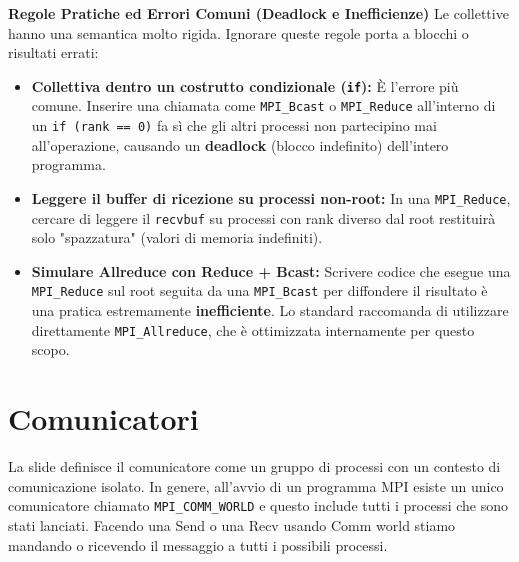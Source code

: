 \begin{framed}
\noindent
\textbf{Regole Pratiche ed Errori Comuni (Deadlock e Inefficienze)}
Le collettive hanno una semantica molto rigida. Ignorare queste regole porta a blocchi o risultati errati:

\begin{itemize}
    \item \textbf{Collettiva dentro un costrutto condizionale (\texttt{if}):} È l'errore più comune. Inserire una chiamata come \texttt{MPI\_Bcast} o \texttt{MPI\_Reduce} all'interno di un \texttt{if (rank == 0)} fa sì che gli altri processi non partecipino mai all'operazione, causando un \textbf{deadlock} (blocco indefinito) dell'intero programma.
    \item \textbf{Leggere il buffer di ricezione su processi non-root:} In una \texttt{MPI\_Reduce}, cercare di leggere il \texttt{recvbuf} su processi con rank diverso dal root restituirà solo "spazzatura" (valori di memoria indefiniti).
    \item \textbf{Simulare Allreduce con Reduce + Bcast:} Scrivere codice che esegue una \texttt{MPI\_Reduce} sul root seguita da una \texttt{MPI\_Bcast} per diffondere il risultato è una pratica estremamente \textbf{inefficiente}. Lo standard raccomanda di utilizzare direttamente \texttt{MPI\_Allreduce}, che è ottimizzata internamente per questo scopo.
\end{itemize}
\end{framed}

\section{Comunicatori}
La slide definisce il comunicatore come un gruppo di processi con un contesto di comunicazione isolato. In genere, all'avvio di un programma MPI esiste un unico comunicatore chiamato \texttt{MPI\_COMM\_WORLD} e questo include tutti i processi che sono stati lanciati. Facendo una Send o una Recv usando Comm world stiamo mandando o ricevendo il messaggio a tutti i possibili processi.

